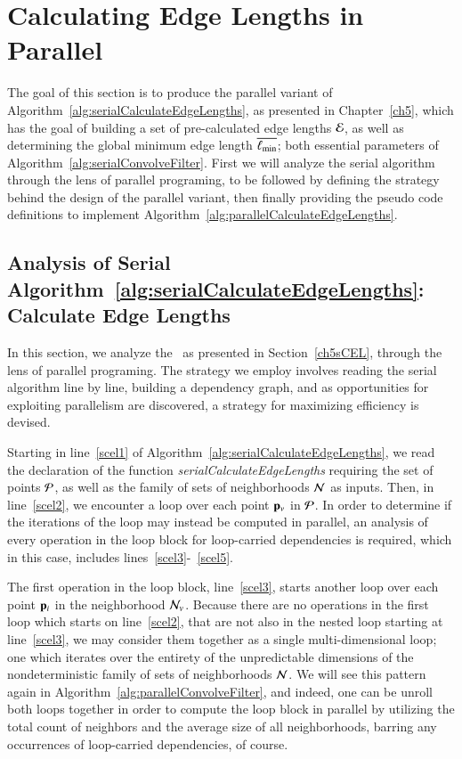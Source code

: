 %
%
%
%
\section{Calculating Edge Lengths in Parallel}
\label{ch6sCELP}
The goal of this section is to produce the parallel variant of  Algorithm~\ref{alg:serialCalculateEdgeLengths}, as presented in Chapter~\ref{ch5}, which has the goal of building a set of pre-calculated edge lengths $\mathcal{E}$, as well as determining the global minimum edge length $\overline{\ell_\text{min}}$; both essential parameters of Algorithm~\ref{alg:serialConvolveFilter}. First we will analyze the serial algorithm through the lens of parallel programing, to be followed by defining the strategy behind the design of the parallel variant, then finally providing the pseudo code definitions to implement Algorithm~\ref{alg:parallelCalculateEdgeLengths}.


%
%
\subsection{Analysis of Serial Algorithm~\ref{alg:serialCalculateEdgeLengths}: Calculate Edge Lengths}
\label{ch6sCELPssASACEL}
In this section, we analyze the~ as presented in Section~\ref{ch5sCEL}, through the lens of parallel programing. The strategy we employ involves reading the serial algorithm line by line, building a dependency graph, and as opportunities for exploiting parallelism are discovered, a strategy for maximizing efficiency is devised.

Starting in line~\ref{scel1} of Algorithm~\ref{alg:serialCalculateEdgeLengths}, we read the declaration of the function \textit{serialCalculateEdgeLengths} requiring the set of points $\mathcal{P}$, as well as the family of sets of neighborhoods $\mathcal{N}$ as inputs. Then, in line~\ref{scel2}, we encounter a loop over each point $\mathbf{p}_v$ in $\mathcal{P}$. In order to determine if the iterations of the loop may instead be computed in parallel, an analysis of every operation in the loop block for loop-carried dependencies is required, which in this case, includes lines~\ref{scel3}-~\ref{scel5}.

The first operation in the loop block, line~\ref{scel3}, starts another loop over each point $\mathbf{p}_i$ in the neighborhood $\mathcal{N}_v$. Because there are no operations in the first loop which starts on line~\ref{scel2}, that are not also in the nested loop starting at line~\ref{scel3}, we may consider them together as a single multi-dimensional loop; one which iterates over the entirety of the unpredictable dimensions of the nondeterministic family of sets of neighborhoods $\mathcal{N}$. We will see this pattern again in Algorithm~\ref{alg:parallelConvolveFilter}, and indeed, one can be unroll both loops together in order to compute the loop block in parallel by utilizing the total count of neighbors and the average size of all neighborhoods, barring any occurrences of loop-carried dependencies, of course.

